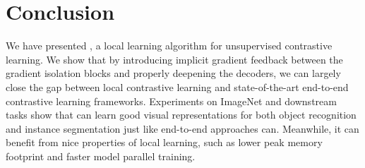 \section{Conclusion}
We have presented {\ours}, a local learning algorithm for unsupervised contrastive learning. We show
that by introducing implicit gradient feedback between the gradient isolation blocks and properly
deepening the decoders, we can largely close the gap between local contrastive learning and
state-of-the-art end-to-end contrastive learning frameworks. Experiments on ImageNet and downstream
tasks show that {\ours} can learn good visual representations for both object recognition and
instance segmentation just like end-to-end approaches can. Meanwhile, it can benefit from nice
properties of local learning, such as lower peak memory footprint and faster model parallel
training.